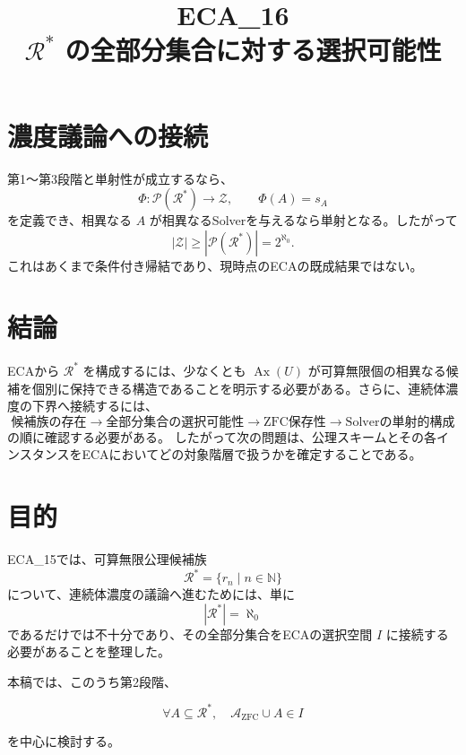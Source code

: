 \documentclass[11pt,a4paper]{article}
\begin{document}
\section{濃度議論への接続}
第1～第3段階と単射性が成立するなら、
\[
\Phi:\mathcal{P}(\mathcal{R}^*)\to\mathcal{Z},\qquad \Phi(A)=s_A
\]
を定義でき、相異なる $A$ が相異なるSolverを与えるなら単射となる。したがって
\[
|\mathcal{Z}|\ge|\mathcal{P}(\mathcal{R}^*)|=2^{\aleph_0}.
\]
これはあくまで条件付き帰結であり、現時点のECAの既成結果ではない。

\section{結論}
ECAから $\mathcal{R}^*$ を構成するには、少なくとも $\operatorname{Ax}(U)$ が可算無限個の相異なる候補を個別に保持できる構造であることを明示する必要がある。さらに、連続体濃度の下界へ接続するには、
\[
\boxed{\text{候補族の存在}\to\text{全部分集合の選択可能性}\to\text{ZFC保存性}\to\text{Solverの単射的構成}}
\]
の順に確認する必要がある。
したがって次の問題は、公理スキームとその各インスタンスをECAにおいてどの対象階層で扱うかを確定することである。
























\title{ECA\_16\\$\mathcal{R}^*$ の全部分集合に対する選択可能性}

\section{目的}

ECA\_15では、可算無限公理候補族
\[
\mathcal{R}^*=\{r_n\mid n\in\mathbb N\}
\]
について、連続体濃度の議論へ進むためには、単に
\[
|\mathcal{R}^*|=\aleph_0
\]
であるだけでは不十分であり、その全部分集合をECAの選択空間 $I$ に接続する必要があることを整理した。

本稿では、このうち第2段階、

\[
\boxed{
\forall A\subseteq\mathcal{R}^*,
\quad
\mathcal{A}_{\mathrm{ZFC}}\cup A\in I
}
\]

を中心に検討する。
\end{document}
